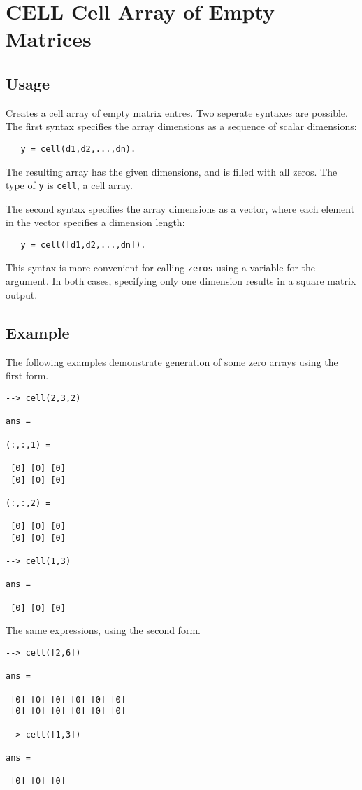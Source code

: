\section{CELL Cell Array of Empty Matrices}

\subsection{Usage}

Creates a cell array of empty matrix entres.  Two seperate 
syntaxes are possible.  The first syntax specifies the array 
dimensions as a sequence of scalar dimensions:
\begin{verbatim}
   y = cell(d1,d2,...,dn).
\end{verbatim}
The resulting array has the given dimensions, and is filled with
all zeros.  The type of \verb|y| is \verb|cell|, a cell array.  
    
The second syntax specifies the array dimensions as a vector,
where each element in the vector specifies a dimension length:
\begin{verbatim}
   y = cell([d1,d2,...,dn]).
\end{verbatim}
This syntax is more convenient for calling \verb|zeros| using a 
variable for the argument.  In both cases, specifying only one
dimension results in a square matrix output.
\subsection{Example}

The following examples demonstrate generation of some zero arrays 
using the first form.
\begin{verbatim}
--> cell(2,3,2)

ans = 

(:,:,1) = 

 [0] [0] [0] 
 [0] [0] [0] 

(:,:,2) = 

 [0] [0] [0] 
 [0] [0] [0] 

--> cell(1,3)

ans = 

 [0] [0] [0] 
\end{verbatim}
The same expressions, using the second form.
\begin{verbatim}
--> cell([2,6])

ans = 

 [0] [0] [0] [0] [0] [0] 
 [0] [0] [0] [0] [0] [0] 

--> cell([1,3])

ans = 

 [0] [0] [0] 
\end{verbatim}
